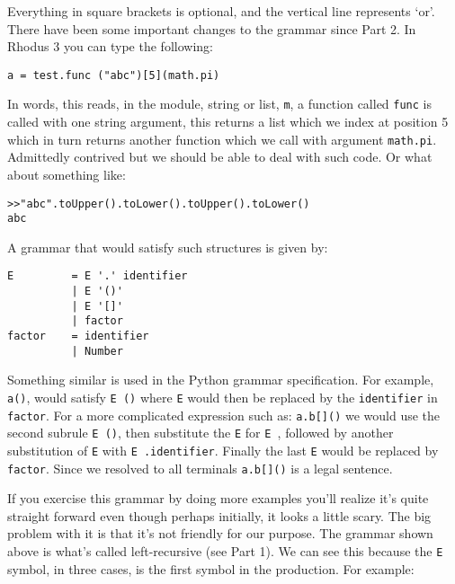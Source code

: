 Everything in square brackets is optional, and the vertical line represents `or'. There have been some important changes to the grammar since Part 2. In Rhodus 3 you can type the following:

\begin{lstlisting}
a = test.func ("abc")[5](math.pi)
\end{lstlisting}

In words, this reads, in the module, string or list, {\tt m}, a function called {\tt func} is called with one string argument, this returns a list which we index at position 5 which in turn returns another function which we call with argument {\tt math.pi}. Admittedly contrived but we should be able to deal with such code. Or what about something like:

\begin{lstlisting}
>>"abc".toUpper().toLower().toUpper().toLower()
abc
\end{lstlisting}

A grammar that would satisfy such structures is given by:


{\footnotesize
\begin{verbatim}
E         = E '.' identifier
          | E '()'
          | E '[]'
          | factor
factor    = identifier
          | Number
\end{verbatim} }

Something similar is used in the Python grammar specification. For example, {\tt a()}, would satisfy {\tt E \textquotesingle()\textquotesingle} where {\tt E} would then be replaced by the {\tt identifier} in {\tt factor}. For a more complicated expression such as: {\tt a.b[]()} we would use the second subrule {\tt E \textquotesingle()\textquotesingle}, then substitute the {\tt E} for {\tt E \textquotesingle[]\textquotesingle}, followed by another substitution of {\tt E} with {\tt E \textquotesingle.\textquotesingle identifier}. Finally the last {\tt E} would be replaced by {\tt factor}. Since we resolved to all terminals {\tt a.b[]()} is a legal sentence.

If you exercise this grammar by doing more examples you'll realize it's quite straight forward even though perhaps initially, it looks a little scary.  The big problem with it is that it's not friendly for our purpose. The grammar shown above is what's called left-recursive (see Part 1). We can see this because the {\tt E} symbol, in three cases, is the first symbol in the production.  For example:


